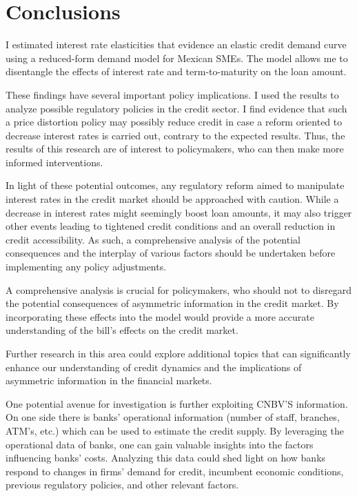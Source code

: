 \documentclass[11pt, oneside]{book}
\begin{document}
\chapter{Conclusions} \label{sect6}

I estimated interest rate elasticities that evidence an elastic credit demand curve using a reduced-form demand model for Mexican SMEs. The model allows me to disentangle the effects of interest rate and term-to-maturity on the loan amount. 

These findings have several important policy implications. I used the results to analyze possible regulatory policies in the credit sector. I find evidence that such a price distortion policy may possibly reduce credit in case a reform oriented to decrease interest rates is carried out, contrary to the expected results. Thus, the results of this research are of interest to policymakers, who can then make more informed interventions.

In light of these potential outcomes, any regulatory reform aimed to manipulate interest rates in the credit market should be approached with caution. While a decrease in interest rates might seemingly boost loan amounts, it may also trigger other events leading to tightened credit conditions and an overall reduction in credit accessibility. As such, a comprehensive analysis of the potential consequences and the interplay of various factors should be undertaken before implementing any policy adjustments.

A comprehensive analysis is crucial for policymakers, who should not to disregard the potential consequences of asymmetric information in the credit market. By incorporating these effects into the model would provide a more accurate understanding of the bill's effects on the credit market. 

 
Further research in this area could explore additional topics that can significantly enhance our understanding of credit dynamics and the implications of asymmetric information in the financial markets. 

One potential avenue for investigation is further exploiting CNBV'S information. On one side there is banks' operational information (number of staff, branches, ATM's, etc.) which can be used to estimate the credit supply. By leveraging the operational data of banks, one can gain valuable insights into the factors influencing banks' costs. Analyzing this data could shed light on how banks respond to changes in firms' demand for credit, incumbent economic conditions, previous regulatory policies, and other relevant factors. 
\end{document}
